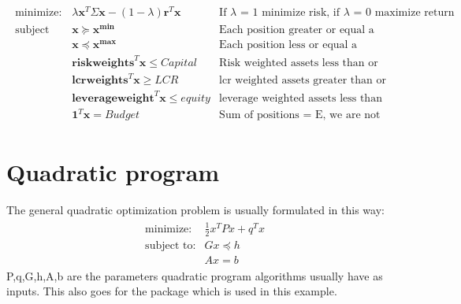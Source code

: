 \documentclass[letterpaper,10pt,english]{jupyterBook}
\begin{document}
\begin{equation*}
\begin{split}
\begin{array}{lll}
\mbox{minimize:}  & \lambda \mathbf x^T \Sigma \mathbf x - (1-\lambda) \mathbf r^T \mathbf x & \mbox{If }\lambda \mbox{ = 1 minimize risk, if } \lambda\mbox{ = 0 maximize return }\\
\mbox{subject to:} & \mathbf x \succeq \mathbf{x^{min}} &\mbox{Each position greater or equal a minimum}\\ 
                   & \mathbf x \preceq \mathbf{x^{max}} &\mbox{Each position less or equal a maximum}\\ 
                   & \mathbf{riskweights}^T\mathbf x \leq Capital &\mbox{Risk weighted assets less than or equal to capital}\\ 
                   & \mathbf{lcrweights}^T\mathbf x \geq LCR &\mbox{lcr weighted assets greater than or equal to LCR target}\\ 
                   & \mathbf{leverageweight}^T\mathbf x \leq equity &\mbox{leverage weighted assets less than or equal to equity}\\ 
                   & \mathbf 1^T\mathbf x = Budget & \mbox{Sum of positions = E, we are not getting more money}
\end{array}
\end{split}
\end{equation*}

\section{Quadratic program}
\label{\detokenize{content/howto/optimization/Optimize_simpel:quadratic-program}}
\sphinxAtStartPar
The general quadratic optimization problem is usually formulated in this way:
\begin{equation*}
\begin{split}
\begin{array}{lr}
\mbox{minimize:}   &\frac{1}{2} x^TPx + q^T x \\
\mbox{subject to:} & G x \preceq h \\
                  & Ax = b
\end{array}
\end{split}
\end{equation*}
\sphinxAtStartPar
P,q,G,h,A,b are the parameters quadratic program algorithms usually have as inputs.
This also goes for the  package which is used in this example.
\end{document}
